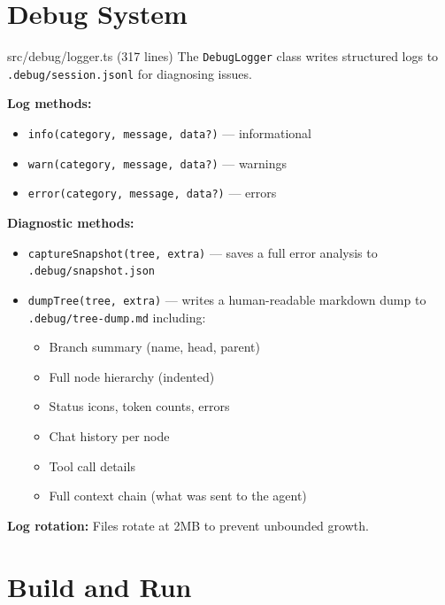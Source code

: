 \documentclass[12pt, a4paper]{article}
\begin{document}
\newpage

\section{Debug System}

\begin{filebox}{src/debug/logger.ts \quad (317 lines)}
The \texttt{DebugLogger} class writes structured logs to \texttt{.debug/session.jsonl} for diagnosing issues.

\textbf{Log methods:}
\begin{itemize}
    \item \texttt{info(category, message, data?)} --- informational
    \item \texttt{warn(category, message, data?)} --- warnings
    \item \texttt{error(category, message, data?)} --- errors
\end{itemize}

\textbf{Diagnostic methods:}
\begin{itemize}
    \item \texttt{captureSnapshot(tree, extra)} --- saves a full error analysis to \texttt{.debug/snapshot.json}
    \item \texttt{dumpTree(tree, extra)} --- writes a human-readable markdown dump to \texttt{.debug/tree-dump.md} including:
    \begin{itemize}
        \item Branch summary (name, head, parent)
        \item Full node hierarchy (indented)
        \item Status icons, token counts, errors
        \item Chat history per node
        \item Tool call details
        \item Full context chain (what was sent to the agent)
    \end{itemize}
\end{itemize}

\textbf{Log rotation:} Files rotate at 2MB to prevent unbounded growth.
\end{filebox}

\newpage

\section{Build and Run}
\end{document}
